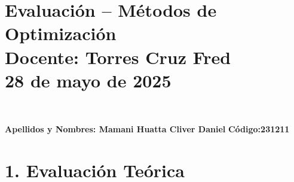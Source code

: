 \documentclass[a4paper,10pt]{article}
\begin{document}
\section*{Evaluación – Métodos de Optimización \\{Docente: Torres Cruz Fred } \\ \large 28 de mayo de 2025} \

\vspace{0.5cm}
\textbf{Apellidos y Nombres:  Mamani Huatta Cliver Daniel }  \hfill \textbf{Código:231211} 

\vspace{0.5cm}
\section*{1. Evaluación Teórica}
\end{document}
